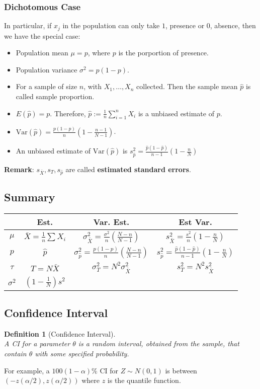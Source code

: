 \documentclass[12pt]{article}
\newcommand{\var}{\mathrm{Var}}
\newtheorem{definition}{Definition}[section]
\theoremstyle{definition}
\begin{document}
\subsubsection{Dichotomous Case}
In particular, if $x_j$ in the population can only take $1$, presence or $0$, absence, then we have the special case:
\begin{itemize}
  \item Population mean $\mu=p$, where $p$ is the porportion of presence.
  \item Population variance $\sigma^2 = p(1-p)$.
  \item For a sample of size $n$, with $X_1,\ldots, X_n$ collected. Then the sample mean $\hat{p}$ is called sample proportion.
  \item $E(\hat{p}) = p$. Therefore, $\hat{p}:=\frac{1}{n}\sum_{i=1}^n X_i$ is a unbiased estimate of $p$. 
  \item $\var(\hat{p}) = \frac{p(1-p)}{n}(1-\frac{n-1}{N-1})$.
  \item An unbiased estimate of $\var(\hat{p})$ is
  $
s_{\hat{p}}^2 = \frac{\hat{p}(1-\hat{p})}{n-1}(1-\frac{n}{N})
  $
\end{itemize}
\textbf{Remark}: $s_{\bar{X}}, s_T, s_{\hat{p}}$ are called \textbf{estimated standard errors}.
\subsection{Summary}
\begin{table}[h]
\begin{tabular}{|c|c|c|c|}
\hline
 & Est. & Var. Est.& Est Var. \\\hline
$\mu$                & $\bar{X} = \frac{1}{n}\sum X_i$ & $\sigma^2_{\bar{X}} = \frac{\sigma^2}{n}(\frac{N-n}{N-1})$ & $s_{\bar{X}}^2 = \frac{s^2}{n}(1-\frac{n}{N})$\\\hline
$p$                  & $\hat{p}$                               & $\sigma^2_{\hat{p}} = \frac{p(1-p)}{n}(\frac{N-n}{N-1})$     & $s_{\hat{p}}^2 = \frac{\hat{p}(1-\hat{p})}{n-1}(1-\frac{n}{N})$ \\\hline
$\tau$               & $T=N\bar{X}$                            & $\sigma_T^2 = N^2\sigma_{\bar{X}}^2$                         & $s_T^2 = N^2s^2_{\bar{X}}$\\\hline
$\sigma^2$           & $(1-\frac{1}{N})s^2$\\\hline
\end{tabular}
\end{table}
\subsection{Confidence Interval}
\begin{definition}[Confidence Interval]
\hfill\\\normalfont A CI for a parameter $\theta$ is a random interval, obtained from the sample, that contain $\theta$ with some specified probability.
\end{definition}
For example, a $100(1-\alpha)$\% CI for $Z\sim N(0,1)$ is between $(-z(\alpha/2), z(\alpha/2))$ where $z$ is the quantile function.
\end{document}
